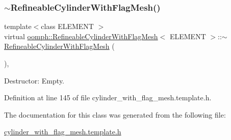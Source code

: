 \subsubsection{\texorpdfstring{$\sim$\+Refineable\+Cylinder\+With\+Flag\+Mesh()}{~RefineableCylinderWithFlagMesh()}}
{\footnotesize\ttfamily template$<$class E\+L\+E\+M\+E\+NT $>$ \\
virtual \hyperlink{classoomph_1_1RefineableCylinderWithFlagMesh}{oomph\+::\+Refineable\+Cylinder\+With\+Flag\+Mesh}$<$ E\+L\+E\+M\+E\+NT $>$\+::$\sim$\hyperlink{classoomph_1_1RefineableCylinderWithFlagMesh}{Refineable\+Cylinder\+With\+Flag\+Mesh} (\begin{DoxyParamCaption}{ }\end{DoxyParamCaption})\hspace{0.3cm}{\ttfamily [inline]}, {\ttfamily [virtual]}}



Destructor\+: Empty. 



Definition at line 145 of file cylinder\+\_\+with\+\_\+flag\+\_\+mesh.\+template.\+h.



The documentation for this class was generated from the following file\+:\begin{DoxyCompactItemize}
\item 
\hyperlink{cylinder__with__flag__mesh_8template_8h}{cylinder\+\_\+with\+\_\+flag\+\_\+mesh.\+template.\+h}\end{DoxyCompactItemize}
